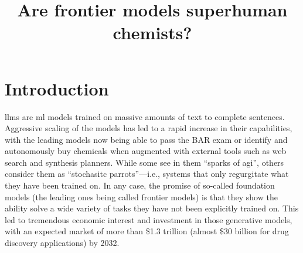\documentclass[11pt, oneside]{article}
\title{\textsf{Are frontier models superhuman chemists?}}
\begin{document}
\maketitle

\begin{abstract}
\end{abstract}

\clearpage

\section{Introduction}
\Glspl{llm} are \gls{ml} models trained on massive amounts of text to complete sentences. 
Aggressive scaling of the models has led to a rapid increase in their capabilities,\cite{brown2020language} with the leading models now being able to pass the BAR exam or identify and autonomously buy chemicals when augmented with external tools such as web search and synthesis planners.\cite{openai2024gpt4}
While some see in them \enquote{sparks of \gls{agi}},\cite{bubeck2023sparks} others consider them as \enquote{stochasitc parrots}---i.e., systems that only regurgitate what they have been trained on.\cite{bender2021dangers}
In any case, the promise of so-called foundation models (the leading ones being called frontier models) is that they show the ability solve a wide variety of tasks they have not been explicitly trained on.\cite{bommasani2021opportunities, anderljung2023frontier}
This led to tremendous economic interest and investment in those generative models, with an expected market of more than \$1.3 trillion (almost \$30 billion for drug discovery applications) by 2032.\cite{bloomberg}
\end{document}

